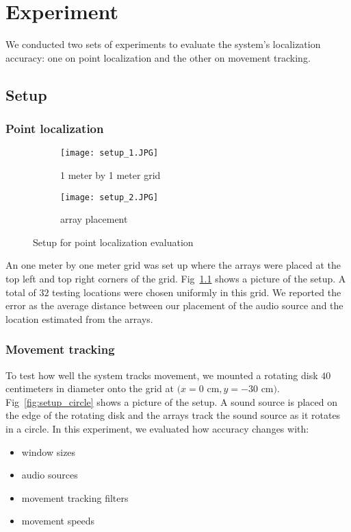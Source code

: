 \chapter{Experiment}
We conducted two sets of experiments to evaluate the system's localization accuracy: one on point localization and the other on movement tracking. 

\section{Setup}
\subsection{Point localization}

\begin{figure}[]
  \centering
  \begin{subfigure}[]{.46\textwidth}
    \texttt{[image: setup\_1.JPG]}
    \caption{1 meter by 1 meter grid}
  \end{subfigure}
  \begin{subfigure}[]{.46\textwidth}
    \texttt{[image: setup\_2.JPG]}
    \caption{array placement}
  \end{subfigure}
  \caption{Setup for point localization evaluation}
  \label{fig:setup_point}
\end{figure}

An one meter by one meter grid was set up where the arrays were placed at the top left and top right corners of the grid. Fig~\ref{fig:setup_point} shows a picture of the setup. A total of $32$ testing locations were chosen uniformly in this grid. We reported the error as the average distance between our placement of the audio source and the location estimated from the arrays.

\subsection{Movement tracking}
To test how well the system tracks movement, we mounted a rotating disk $40$ centimeters in diameter onto the grid at $(x=0$ cm$, y=-30$ cm$)$. Fig~\ref{fig:setup_circle} shows a picture of the setup. A sound source is placed on the edge of the rotating disk and the arrays track the sound source as it rotates in a circle. In this experiment, we evaluated how accuracy changes with:
\begin{itemize}
\item window sizes
\item audio sources
\item movement tracking filters
\item movement speeds
\end{itemize}


